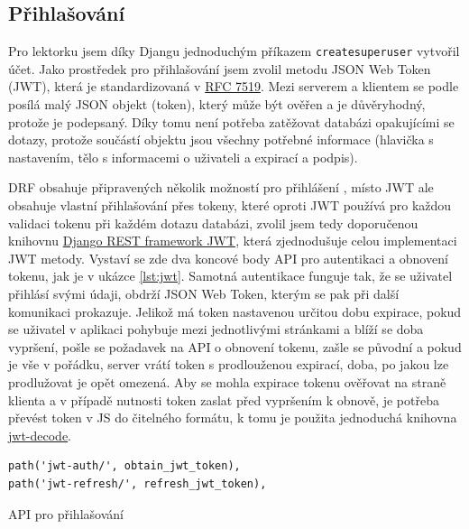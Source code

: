     \subsection{Přihlašování}
    Pro lektorku jsem díky Djangu jednoduchým příkazem \verb|createsuperuser| vytvořil účet. Jako prostředek pro přihlašování jsem zvolil metodu JSON Web Token (JWT), která je standardizovaná v \href{https://tools.ietf.org/html/rfc7519}{RFC 7519}. Mezi serverem a klientem se podle \cite{jwt1} posílá malý JSON objekt (token), který může být ověřen a je důvěryhodný, protože je podepsaný. Díky tomu není potřeba zatěžovat databázi opakujícími se dotazy, protože součástí objektu jsou všechny potřebné informace (hlavička s nastavením, tělo s informacemi o uživateli a expirací a podpis).
    
    DRF obsahuje připravených několik možností pro přihlášení \cite{drf1}, místo JWT ale obsahuje vlastní přihlašování přes tokeny, které oproti JWT používá pro každou validaci tokenu při každém dotazu databázi, zvolil jsem tedy doporučenou knihovnu \href{http://getblimp.github.io/django-rest-framework-jwt/}{Django REST framework JWT}, která zjednodušuje celou implementaci JWT metody. Vystaví se zde dva koncové body API pro autentikaci a obnovení tokenu, jak je v ukázce \ref{lst:jwt}. Samotná autentikace funguje tak, že se uživatel přihlásí svými údaji, obdrží JSON Web Token, kterým se pak při další komunikaci prokazuje. Jelikož má token nastavenou určitou dobu expirace, pokud se uživatel v aplikaci pohybuje mezi jednotlivými stránkami a blíží se doba vypršení, pošle se požadavek na API o obnovení tokenu, zašle se původní a pokud je vše v pořádku, server vrátí token s prodlouženou expirací, doba, po jakou lze prodlužovat je opět omezená. Aby se mohla expirace tokenu ověřovat na straně klienta a v případě nutnosti token zaslat před vypršením k obnově, je potřeba převést token v JS do čitelného formátu, k tomu je použita jednoduchá knihovna \href{https://github.com/auth0/jwt-decode}{jwt-decode}.
    
    \begin{listing}[ht]
    	\begin{verbatim}
path('jwt-auth/', obtain_jwt_token),
path('jwt-refresh/', refresh_jwt_token),
    	\end{verbatim}
    	\caption{API pro přihlašování}\label{lst:jwt}
    \end{listing}

    
